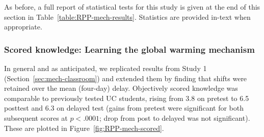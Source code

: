 As before, a full report of statistical tests for this study is given at the end of this
section in Table~\ref{table:RPP-mech-results}. Statistics are provided in-text
when appropriate.
    
\subsubsection{Scored knowledge: Learning the global warming mechanism}

In general and as anticipated, we replicated results from Study 1
(Section~\ref{sec:mech-classroom}) and extended
them by finding that shifts were retained over the mean (four-day) delay.
Objectively scored knowledge was comparable to previously tested UC students,
rising from 3.8 on pretest to 6.5 posttest and 6.3 on delayed test (gains from
pretest were significant for both subsequent scores at $p<.0001$; drop from post
to delayed was not significant). These are plotted in
Figure~\ref{fig:RPP-mech-scored}. 


